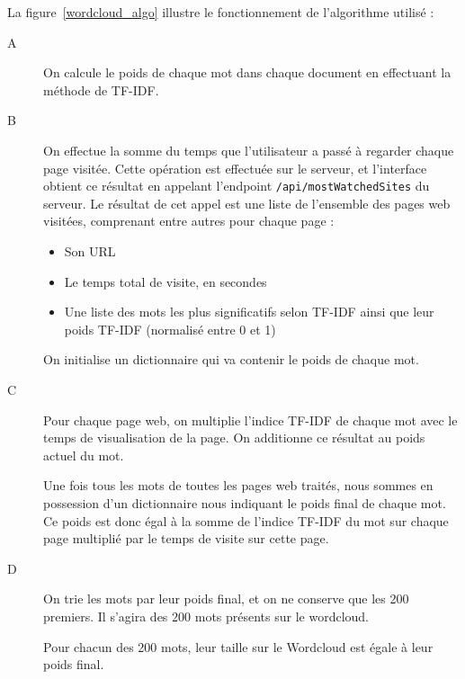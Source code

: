 			La figure~\ref{wordcloud_algo} illustre le fonctionnement de l'algorithme utilisé :
			\begin{description}
				\item[A] On calcule le poids de chaque mot dans chaque document en effectuant la méthode de TF-IDF.

				\item[B] On effectue la somme du temps que l'utilisateur a passé à regarder chaque page visitée. Cette opération est effectuée sur le serveur, et l'interface obtient ce résultat en appelant l'endpoint \texttt{/api/mostWatchedSites} du serveur. Le résultat de cet appel est une liste de l'ensemble des pages web visitées, comprenant entre autres pour chaque page : 
				\begin{itemize}
					\item Son URL
					\item Le temps total de visite, en secondes
					\item Une liste des mots les plus significatifs selon TF-IDF ainsi que leur poids TF-IDF (normalisé entre 0 et 1)
				\end{itemize}
				
				On initialise un dictionnaire qui va contenir le poids de chaque mot.

				\item[C] Pour chaque page web, on multiplie l'indice TF-IDF de chaque mot avec le temps de visualisation de la page. On additionne ce résultat au poids actuel du mot.
				
				Une fois tous les mots de toutes les pages web traités, nous sommes en possession d'un dictionnaire nous indiquant le poids final de chaque mot. Ce poids est donc égal à la somme de l'indice TF-IDF du mot sur chaque page multiplié par le temps de visite sur cette page.
				
				\item[D] On trie les mots par leur poids final, et on ne conserve que les 200 premiers. Il s'agira des 200 mots présents sur le wordcloud.
				
				Pour chacun des 200 mots, leur taille sur le Wordcloud est égale à leur poids final.
			\end{description}


